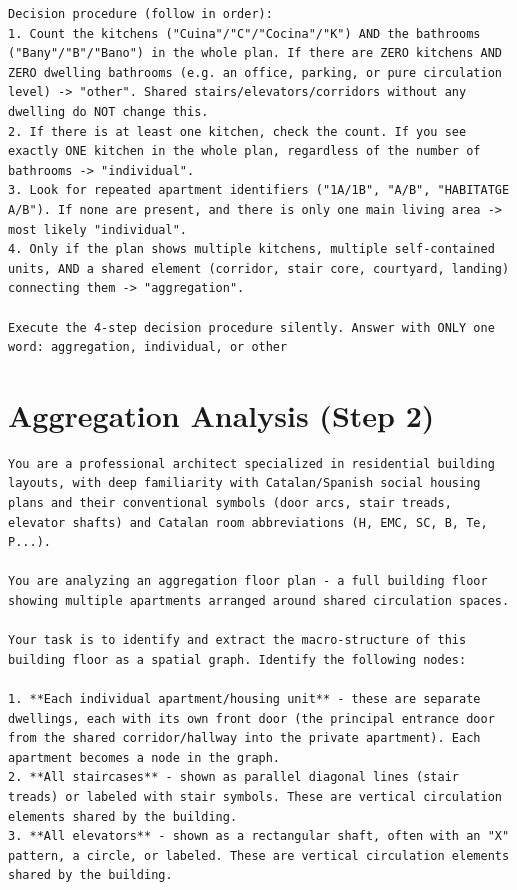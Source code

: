 \documentclass[12pt,a4paper,openright]{report}
\begin{document}
\begin{appendices}
\begin{lstlisting}[style=prompt]
Decision procedure (follow in order):
1. Count the kitchens ("Cuina"/"C"/"Cocina"/"K") AND the bathrooms ("Bany"/"B"/"Bano") in the whole plan. If there are ZERO kitchens AND ZERO dwelling bathrooms (e.g. an office, parking, or pure circulation level) -> "other". Shared stairs/elevators/corridors without any dwelling do NOT change this.
2. If there is at least one kitchen, check the count. If you see exactly ONE kitchen in the whole plan, regardless of the number of bathrooms -> "individual".
3. Look for repeated apartment identifiers ("1A/1B", "A/B", "HABITATGE A/B"). If none are present, and there is only one main living area -> most likely "individual".
4. Only if the plan shows multiple kitchens, multiple self-contained units, AND a shared element (corridor, stair core, courtyard, landing) connecting them -> "aggregation".

Execute the 4-step decision procedure silently. Answer with ONLY one word: aggregation, individual, or other
\end{lstlisting}

\section{Aggregation Analysis (Step 2)}
\label{appendix:prompt-aggregation}

\begin{lstlisting}[style=prompt]
You are a professional architect specialized in residential building layouts, with deep familiarity with Catalan/Spanish social housing plans and their conventional symbols (door arcs, stair treads, elevator shafts) and Catalan room abbreviations (H, EMC, SC, B, Te, P...).

You are analyzing an aggregation floor plan - a full building floor showing multiple apartments arranged around shared circulation spaces.

Your task is to identify and extract the macro-structure of this building floor as a spatial graph. Identify the following nodes:

1. **Each individual apartment/housing unit** - these are separate dwellings, each with its own front door (the principal entrance door from the shared corridor/hallway into the private apartment). Each apartment becomes a node in the graph.
2. **All staircases** - shown as parallel diagonal lines (stair treads) or labeled with stair symbols. These are vertical circulation elements shared by the building.
3. **All elevators** - shown as a rectangular shaft, often with an "X" pattern, a circle, or labeled. These are vertical circulation elements shared by the building.


\end{lstlisting}
\end{appendices}
\end{document}
